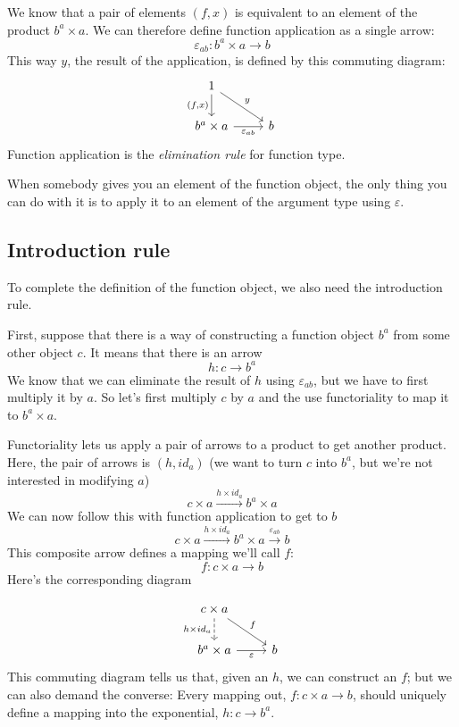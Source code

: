 \documentclass[DaoFP]{subfiles}
\begin{document}
We know that a pair of elements $(f, x)$ is equivalent to an element of the product $b^a \times a$. We can therefore define function application as a single arrow:
\[\varepsilon_{a b} \colon b^a \times a \to b\]
This way $y$, the result of the application, is defined by this commuting diagram:
\[
 \begin{tikzcd}
 1
 \arrow[d, "{(f, x)}"']
 \arrow[rd, "y"]
 \\
 b^a \times a
 \arrow[r, "\varepsilon_{a b}"']
& b
 \end{tikzcd}
\]
Function application is the \emph{elimination rule} for function type. 

When somebody gives you an element of the function object, the only thing you can do with it is to apply it to an element of the argument type using $\varepsilon$. 

\subsection{Introduction rule}
To complete the definition of the function object, we also need the introduction rule. 

First, suppose that there is a way of constructing a function object $b^a$ from some other object $c$. It means that there is an arrow
\[h \colon c \to b^a\]
We know that we can eliminate the result of $h$ using $\varepsilon_{a b}$, but we have to first multiply it by $a$. So let's first multiply $c$ by $a$ and the use functoriality to map it to $b^a \times a$. 

Functoriality lets us apply a pair of arrows to a product to get another product. Here, the pair of arrows is $(h, id_a)$ (we want to turn $c$ into $b^a$, but we're not interested in modifying $a$)
\[ c \times a \xrightarrow{h \times id_a} b^a \times a \]
We can now follow this with function application to get to $b$
\[ c \times a \xrightarrow{h \times id_a} b^a \times a \xrightarrow{\varepsilon_{a b}} b\]
This composite arrow defines a mapping we'll call $f$:
\[f \colon c \times a \to b\]
Here's the corresponding diagram

\[
 \begin{tikzcd}
 c \times a
 \arrow[d, dashed, "h \times id_a"']
 \arrow[rd, "f"]
 \\
 b^a \times a
 \arrow[r, "\varepsilon"']
& b
 \end{tikzcd}
\]
This commuting diagram tells us that, given an $h$, we can construct an $f$; but we can also demand the converse: Every mapping out, $f \colon c \times a \to b$, should uniquely define a mapping into the exponential, $h \colon c \to b^a$. 
\end{document}
